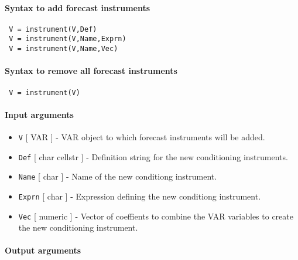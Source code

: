 


	\paragraph{Syntax to add forecast instruments}
 
 \begin{verbatim}
 V = instrument(V,Def)
 V = instrument(V,Name,Exprn)
 V = instrument(V,Name,Vec)
 \end{verbatim}
 
 \paragraph{Syntax to remove all forecast instruments}
 
 \begin{verbatim}
 V = instrument(V)
 \end{verbatim}
 
 \paragraph{Input arguments}
 
 \begin{itemize}
 \item
   \texttt{V} {[} VAR {]} - VAR object to which forecast instruments will
   be added.
 \item
   \texttt{Def} {[} char \textbar{} cellstr {]} - Definition string for
   the new conditioning instruments.
 \item
   \texttt{Name} {[} char {]} - Name of the new conditiong instrument.
 \item
   \texttt{Exprn} {[} char {]} - Expression defining the new conditiong
   instrument.
 \item
   \texttt{Vec} {[} numeric {]} - Vector of coeffients to combine the VAR
   variables to create the new conditioning instrument.
 \end{itemize}
 
 \paragraph{Output arguments}


